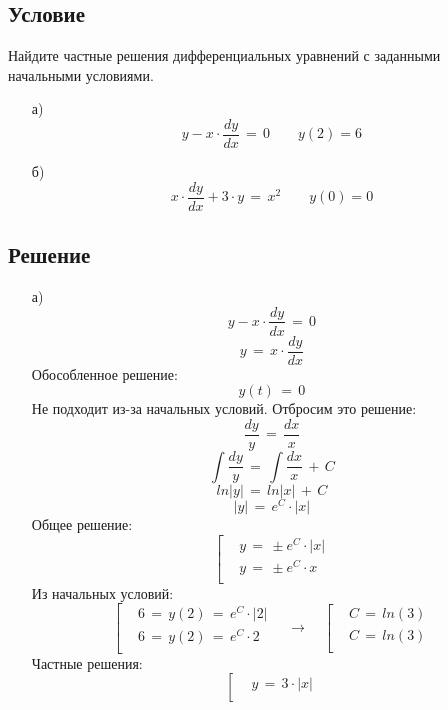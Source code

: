 \documentclass{article}
\begin{document}
\subsection*{Условие}
Найдите частные решения дифференциальных уравнений с заданными начальными условиями.
\begin{enumerate}
\item[а)]
\[ y \! - \! x \! \cdot \! \dfrac{dy}{dx} \, = \, 0 \qquad y(2) \! = \! 6 \]
\item[б)]
\[ x \! \cdot \! \dfrac{dy}{dx} \! + \! 3 \! \cdot \! y \, = \, x^2 \qquad y(0) \! = \! 0 \]
\end{enumerate}
\subsection*{Решение}
\begin{enumerate}
\item[а)]
\[ y \! - \! x \! \cdot \! \dfrac{dy}{dx} \, = \, 0 \]
\[ y \, = \, x \! \cdot \! \dfrac{dy}{dx} \]
Обособленное решение:
\[ y(t) \, = \, 0 \]
Не подходит из-за начальных условий. Отбросим это решение:
\[ \dfrac{dy}{y} \, = \, \dfrac{dx}{x} \]
\[ \int \dfrac{dy}{y} \, = \, \int \dfrac{dx}{x} \, + \, C \]
\[ ln|y| \, = \, ln|x| \, + \, C \]
\[ |y| \, = \, e^C \! \cdot \! |x| \]
Общее решение:
\begin{equation*}
\left[
\begin{aligned}
& y \, = \, \pm e^C \! \cdot \! |x| \\
& y \, = \, \pm e^C \! \cdot \! x \\
\end{aligned}
\right.
\end{equation*}
Из начальных условий:
\begin{equation*}
\left[
\begin{aligned}
& 6 \, = \, y(2) \, = \, e^C \! \cdot \! |2| \\
& 6 \, = \, y(2) \, = \, e^C \! \cdot \! 2 \\
\end{aligned}
\right. \quad \rightarrow \quad 
\left[
\begin{aligned}
& C \, = \, ln(3) \\
& C \, = \, ln(3) \\
\end{aligned}
\right.
\end{equation*}
Частные решения:
\begin{equation*}
\left[
\begin{aligned}
& y \, = \, 3 \! \cdot \! |x| \\

\end{aligned}
\end{equation*}
\end{enumerate}
\end{document}
